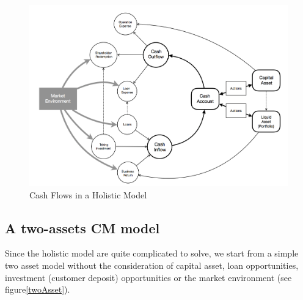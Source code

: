 \documentclass[12pt]{article}
\begin{document}
\begin{figure}
\begin{center}
\includegraphics[scale=.2]{Holistic}
\end{center}
\caption{Cash Flows in a Holistic Model}
\label{Holistic}
\end{figure}

\subsection{A two-assets CM model}
Since the holistic model are quite complicated to solve, we start from a simple two asset model without the consideration of capital asset, loan opportunities, investment (customer deposit) opportunities or the market environment (see figure\ref{twoAsset}).
\end{document}
